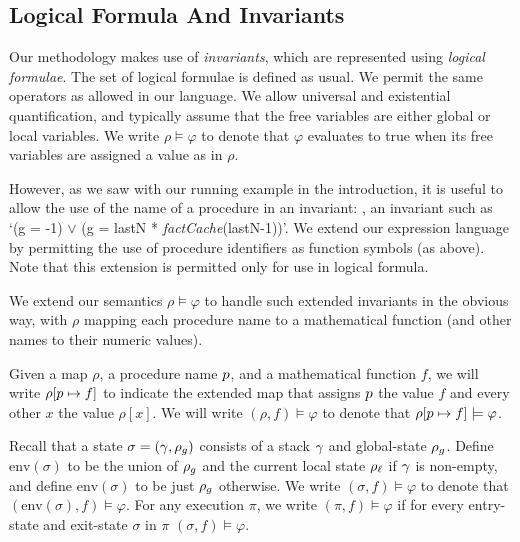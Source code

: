 \subsection*{Logical Formula And Invariants}

Our methodology makes use of \emph{invariants}, which are represented using \emph{logical formulae}.
The set of logical formulae is defined as usual. We permit the same operators as allowed in our language.
We allow universal and existential quantification, and typically assume that the free variables are either
global or local variables.
We write $\rho \models \varphi$
to denote that $\varphi$ evaluates to true when its free variables are assigned a value as in $\rho$.

However, as we saw with our running example in the introduction, it is
useful to allow the use of the name of a procedure in an invariant: \eg, an
invariant such as `(g = -1) $\vee$ (g = lastN *
\emph{factCache}(lastN-1))'.   We
extend our expression language by permitting the use of procedure
identifiers as function symbols (as above). Note that this extension is
permitted only for use in logical formula.

We extend our semantics $\rho \models \varphi$ to handle such extended invariants in the obvious way,
with $\rho$ mapping each procedure name to a mathematical function (and other names to their numeric values).

Given a map $\rho$, a procedure name $p$, and a mathematical function $f$, we will write
$\rho[p \mapsto f]$ to indicate the extended map that assigns $p$ the value $f$ and every
other $x$ the value $\rho[x]$.
We will write $(\rho,f) \models \varphi$ to denote that $\rho[p \mapsto f] \models \varphi$.

Recall that a state $\sigma =(\gamma,\rho_g)$ consists of a stack $\gamma$ and global-state $\rho_g$.
Define $\text{env}(\sigma)$ to be the union of $\rho_g$ and the current local state $\rho_\ell$
if $\gamma$ is non-empty, and define $\text{env}(\sigma)$ to be just $\rho_g$ otherwise.
We write $(\sigma,f) \models \varphi$ to denote that $(\text{env}(\sigma),f) \models \varphi$.
For any execution $\pi$, we write $(\pi,f) \models \varphi$ if for every entry-state and exit-state
$\sigma$ in $\pi$ $(\sigma,f) \models \varphi$.

